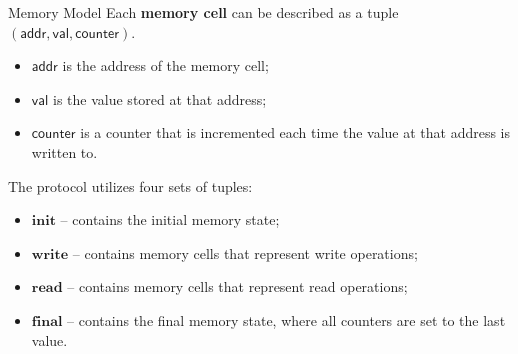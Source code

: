 \documentclass{zkdl-presentation-template}
\begin{document}
    \begin{frame}{Memory Model}
        Each \textbf{memory cell} can be described as a tuple $\mathsf{(addr, val, counter)}$.
        \begin{itemize}
            \item $\mathsf{addr}$ is the address of the memory cell;
            \vspace{-5px}
            \item $\mathsf{val}$ is the value stored at that address;
            \vspace{-5px}
            \item $\mathsf{counter}$ is a counter that is incremented each time the value at that address is written to.
        \end{itemize}
        \pause

        \vspace{5px}
        The protocol utilizes four sets of tuples:
        \begin{itemize}
            \item $\mathbf{init}$ -- contains the initial memory state;
            \vspace{-5px}
            \item $\mathbf{write}$ -- contains memory cells that represent write operations;
            \vspace{-5px}
            \item $\mathbf{read}$ -- contains memory cells that represent read operations;
            \vspace{-5px}
            \item $\mathbf{final}$ -- contains the final memory state, where all counters are set to the last value.
        \end{itemize}
    \end{frame}
\end{document}
